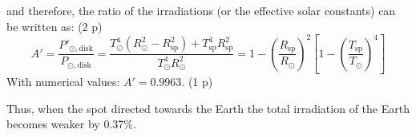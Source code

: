 \begin{description}
  and therefore, the ratio of the irradiations (or the effective solar
  constants) can be written as: \hfill(2 p)
  \begin{equation*}
  A' = \frac{P'_{\odot,\mathrm{disk}}}{P_{\odot,\mathrm{disk}}}
     = \frac{T_\odot^4(R_\odot^2 - R_{\mathrm{sp}}^2)
       + T_{\mathrm{sp}}^4 R_{\mathrm{sp}}^2}{T_\odot^4 R_\odot^2}
     = 1 - \left(\frac{R_{\mathrm{sp}}}{R_\odot}\right)^2
       \left[1 - \left(\frac{T_{\mathrm{sp}}}{T_\odot}\right)^4\right] \tag{7.9}
  \end{equation*}
  With numerical values: $A' = 0.9963$. \hfill(1 p)

  Thus, when the spot directed towards the Earth the total irradiation of the
  Earth becomes weaker by 0.37\%.
\end{description}
